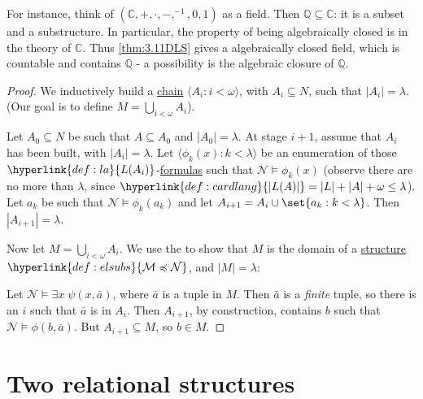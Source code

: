 \documentclass{article}
\let\models\vDash
\begin{document}
For instance, think of $(\mathbb{C}, + , \cdot, -, ^{-1}, 0,1)$ as a field.
Then $\mathbb{Q} \subseteq \mathbb{C}$: it is a subset and a substructure.
In particular, the property of being algebraically closed is in the theory of $\mathbb{C}$.
Thus \cref{thm:3.11DLS} gives a algebraically closed field, which is countable and contains $\mathbb{Q}$ - a possibility is the algebraic closure of $\mathbb{Q}$.

\begin{proof}
  We inductively build a \hyperlink{def:chain}{chain} $\langle A_i  : i < \omega \rangle$, with $A_i \subseteq N$, such that $|A_i| = \lambda$.
  (Our goal is to define $M = \bigcup_{i < \omega} A_i$).

  Let $A_0 \subseteq N$ be such that $A \subseteq A_0$ and $|A_0| = \lambda$.
  At stage $i+1$, assume that $A_i$ has been built, with $|A_i| = \lambda$.
  Let $\langle \phi_k(x) : k < \lambda  \rangle$ be an enumeration of those $\hyperlink{def:la}{L(A_i)}$-\hyperlink{def:form}{formulas} such that $\mathcal{N} \models \phi_k(x)$ (observe there are no more than $\lambda$, since $\hyperlink{def:cardlang}{|L(A)|} = |L| + |A| + \omega \leq \lambda$).
  Let $a_k$ be such that $\mathcal{N} \models \phi_k(a_k)$ and let $A_{i+1} = A_i \cup \set{a_k : k < \lambda}$.
  Then $|A_{i+1}| = \lambda$.

  Now let $M = \bigcup_{i < \omega} A_i$.
  We use the  to show that $M$ is the domain of a \hyperlink{def:str}{structure} $\hyperlink{def:elsubs}{\mathcal{M} \preccurlyeq \mathcal{N}}$, and $|M| = \lambda$:

  Let $\mathcal{N} \models \exists x \; \psi(x,\bar{a})$, where $\bar{a}$ is a tuple in $M$.
  Then $\bar{a}$ is a \emph{finite} tuple, so there is an $i$ such that $\bar{a}$ is in $A_i$.
  Then $A_{i+1}$, by construction, contains $b$ such that $\mathcal{N} \models \phi(b, \bar{a})$.
  But $A_{i+1} \subseteq M$, so $b \in M$.
\end{proof}

\clearpage
\section{Two relational structures}
\end{document}
